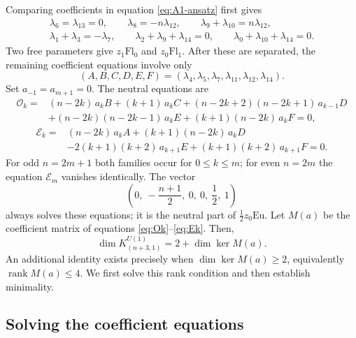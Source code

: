\documentclass[10pt,reqno]{amsart}
\numberwithin{equation}{section}
\theoremstyle{plain}
\theoremstyle{definition}
\DeclareMathOperator{\rank}{rank}
\newcommand{\Eu}{\mathrm{Eu}}
\newcommand{\Fl}{\mathrm{Fl}}
\begin{document}
Comparing coefficients in equation \eqref{eq:A1-ansatz} first gives
\begin{equation*}
\begin{gathered}
	\lambda_6=\lambda_{13}=0,\qquad \lambda_8=-n\lambda_{12},\qquad \lambda_9+\lambda_{10}=n\lambda_{12},\\
	\lambda_1+\lambda_3=-\lambda_7,\qquad \lambda_2+\lambda_9+\lambda_{14}=0,\qquad \lambda_0+\lambda_{10}+\lambda_{14}=0 .
\end{gathered}
\end{equation*}
Two free parameters give $z_1\Fl_0$ and $z_0\Fl_1$. After these are separated, the remaining coefficient equations involve only
\begin{equation*}
	(A,B,C,D,E,F)=(\lambda_4,\lambda_5,\lambda_7,\lambda_{11},\lambda_{12},\lambda_{14}).
\end{equation*}
Set $a_{-1}=a_{m+1}=0$. The neutral equations are
\begin{equation}\label{eq:Ok}
\begin{split}
	\mathcal{O}_k={}&(n-2k)\,a_kB+(k+1)\,a_kC+(n-2k+2)(n-2k+1)\,a_{k-1}D\\
	&+(n-2k)(n-2k-1)\,a_kE+(k+1)(n-2k)\,a_kF=0,
\end{split}
\end{equation}
\begin{equation}\label{eq:Ek}
\begin{split}
	\mathcal{E}_k={}&(n-2k)\,a_kA+(k+1)(n-2k)\,a_kD\\
	&-2(k+1)(k+2)\,a_{k+1}E+(k+1)(k+2)\,a_{k+1}F=0.
\end{split}
\end{equation}
For odd $n=2m+1$ both families occur for $0\le k\le m$; for even $n=2m$ the equation $\mathcal{E}_m$ vanishes identically. The vector
\begin{equation}\label{eq:A1-universal}
	\left(0,\ -\frac{n+1}2,\ 0,\ 0,\ \frac12,\ 1\right)
\end{equation}
always solves these equations; it is the neutral part of $\tfrac12z_0\Eu$. Let $M(a)$ be the coefficient matrix of equations \eqref{eq:Ok}--\eqref{eq:Ek}. Then,
\begin{equation*}
	\dim K^{U(1)}_{(n+3,1)}=2+\dim\ker M(a).
\end{equation*}
An additional identity exists precisely when $\dim\ker M(a)\ge2$, equivalently $\rank M(a)\le4$. We first solve this rank condition and then establish minimality.

\subsection{Solving the coefficient equations}\label{sec:A1-solve}
\end{document}
